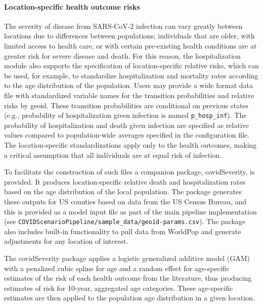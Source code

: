 {\paragraph{Location-specific health outcome risks}
The severity of disease from SARS-CoV-2 infection can vary greatly between locations due to differences between populations; individuals that are older, with limited access to health care, or with certain pre-existing health conditions are at greater risk for severe disease and death. For this reason, the hospitalization module also supports the specification of location-specific relative risks, which can be used, for example, to standardize hospitalization and mortality rates according to the age distribution of the population. Users may provide a wide format data file with standardized variable names for the transition probabilities and relative risks by geoid. These transition probabilities are conditional on previous states (e.g., probability of hospitalization given infection is named \verb|p_hosp_inf|). The probability of hospitalization and death given infection are specified as relative values compared to population-wide averages specified in the configuration file. The location-specific standardizations apply only to the health outcomes, making a critical assumption that all individuals are at equal risk of infection.

To facilitate the construction of such files a companion package, covidSeverity, is provided. It produces location-specific relative death and hospitalization rates based on the age distribution of the local population\cite{Lauer:HopkinsIDDCovidSeverityInitial:2020}. The package generates these outputs for US counties based on data from the US Census Bureau, and this is provided as a model input file as part of the main pipeline implementation (see \verb|COVIDScenarioPipeline/sample_data/geoid-params.csv|). The package also includes built-in functionality to pull data from WorldPop and generate adjustments for any location of interest\cite{Lauer:HopkinsIDDCovidSeverityInitial:2020}.

The covidSeverity package applies a logistic generalized additive model (GAM) with a penalized cubic spline for age and a random effect for age-specific estimates of the risk of each health outcome from the literature, thus producing estimates of risk for 10-year, aggregated age categories. These age-specific estimates are then applied to the population age distribution in a given location.

}
